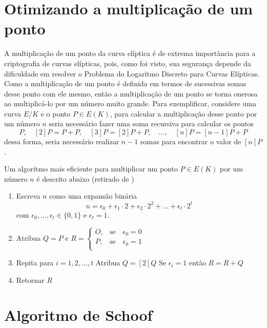 \begin{apendicesenv}

\partapendices

\chapter{Otimizando a multiplicação de um ponto}

A multiplicação de um ponto da curva elíptica é de extrema importância para a criptografia de curvas elípticas, pois, como foi visto, sua segurança depende da dificuldade em resolver o Problema do Logaritmo Discreto para Curvas Elípticas. Como a multiplicação de um ponto é definida em termos de sucessivas somas desse ponto com ele mesmo, então a multiplicação de um ponto se torna onerosa ao multiplicá-lo por um número muito grande. Para exemplificar, considere uma curva $E/K$ e o ponto $P \in E(K)$, para calcular a multiplicação desse ponto por um número $n$ seria necessário fazer uma soma recursiva para calcular os pontos
$$
P,\quad [2]P = P + P,\quad [3]P = [2]P + P,\quad \dots,\quad [n]P = [n-1]P + P
$$
dessa forma, seria necessário realizar $n-1$ somas para encontrar o valor de $[n]P$. \cite{Silverman:2009}

Um algoritmo mais eficiente para multiplicar um ponto $P \in E(K)$ por um número $n$ é descrito abaixo (retirado de \cite{Silverman:2009})

\begin{enumerate}
  \item Escreva $n$ como uma expansão binária $$n = \epsilon_0 + \epsilon_1 \cdot 2 + \epsilon_2 \cdot 2^2 + \dots + \epsilon_t \cdot 2^t$$
com $\epsilon_0, \dots, \epsilon_t \in \{0, 1\}$ e $\epsilon_t = 1$.
  \item Atribua $Q = P$ e
	$
	R = \begin{cases}
	O, &\mbox{se} \quad\epsilon_0 = 0\\
	P, &\mbox{se} \quad\epsilon_0 = 1\\
	\end{cases}
	$
  \item Repita para $i = 1, 2, \dots, t$
    \subitem Atribua $Q = [2]Q$
    \subitem Se $\epsilon_i = 1$ então $R = R + Q$
  \item Retornar $R$
\end{enumerate}

\chapter{Algoritmo de Schoof}


\end{apendicesenv}
